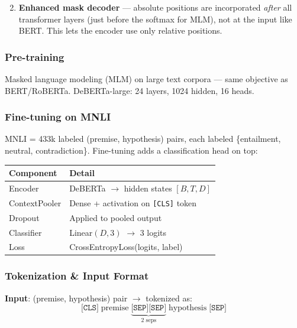 \documentclass[10pt,a4paper,twocolumn]{article}
\begin{document}
\begin{enumerate}[nosep,leftmargin=10pt]\setcounter{enumi}{1}
\item \textbf{Enhanced mask decoder} --- absolute positions are incorporated \emph{after} all transformer layers (just before the softmax for MLM), not at the input like BERT. This lets the encoder use only relative positions.
\end{enumerate}

\subsubsection{Pre-training}

Masked language modeling (MLM) on large text corpora --- same objective as BERT/RoBERTa. DeBERTa-large: 24 layers, 1024 hidden, 16 heads.

\subsubsection{Fine-tuning on MNLI}

MNLI = 433k labeled (premise, hypothesis) pairs, each labeled \{entailment, neutral, contradiction\}. Fine-tuning adds a classification head on top:

\begin{scriptsize}
\begin{tabular}{@{}ll@{}}
\toprule
\textbf{Component} & \textbf{Detail} \\
\midrule
Encoder & DeBERTa $\to$ hidden states $[B, T, D]$ \\
ContextPooler & Dense + activation on \texttt{[CLS]} token \\
Dropout & Applied to pooled output \\
Classifier & Linear$(D, 3)$ $\to$ 3 logits \\
Loss & CrossEntropyLoss(logits, label) \\
\bottomrule
\end{tabular}
\end{scriptsize}

\subsubsection{Tokenization \& Input Format}

\textbf{Input}: (premise, hypothesis) pair $\to$ tokenized as:
\[
\texttt{[CLS]}\;\text{premise}\;\underbrace{\texttt{[SEP][SEP]}}_{\text{2 seps}}\;\text{hypothesis}\;\texttt{[SEP]}
\]
\end{document}
